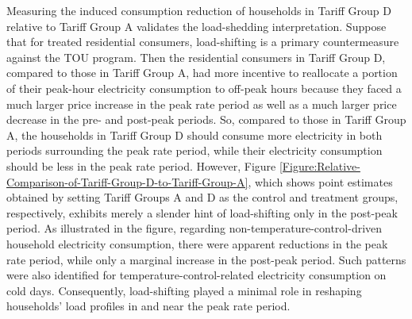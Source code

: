 Measuring the induced consumption reduction of households in Tariff Group D relative to Tariff Group A validates the load-shedding interpretation. Suppose that for treated residential consumers, load-shifting is a primary countermeasure against the TOU program. Then the residential consumers in Tariff Group D, compared to those in Tariff Group A, had more incentive to reallocate a portion of their peak-hour electricity consumption to off-peak hours because they faced a much larger price increase in the peak rate period as well as a much larger price decrease in the pre- and post-peak periods. So, compared to those in Tariff Group A, the households in Tariff Group D should consume more electricity in both periods surrounding the peak rate period, while their electricity consumption should be less in the peak rate period. However, Figure \ref{Figure:Relative-Comparison-of-Tariff-Group-D-to-Tariff-Group-A}, which shows point estimates obtained by setting Tariff Groups A and D as the control and treatment groups, respectively, exhibits merely a slender hint of load-shifting only in the post-peak period. As illustrated in the figure, regarding non-temperature-control-driven household electricity consumption, there were apparent reductions in the peak rate period, while only a marginal increase in the post-peak period. Such patterns were also identified for temperature-control-related electricity consumption on cold days. Consequently, load-shifting played a minimal role in reshaping households' load profiles in and near the peak rate period. 
